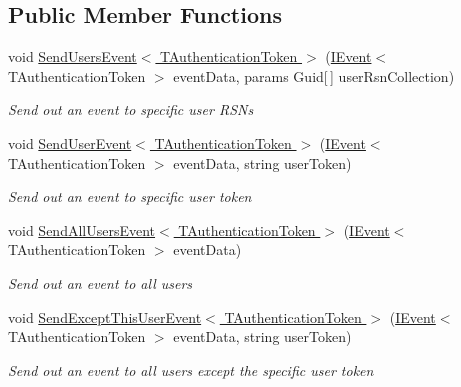 \subsection*{Public Member Functions}
\begin{DoxyCompactItemize}
\item 
void \hyperlink{interfaceCqrs_1_1WebApi_1_1SignalR_1_1Hubs_1_1INotificationHub_a85bd03a0bf9c2083822c4b67691f4297_a85bd03a0bf9c2083822c4b67691f4297}{Send\+Users\+Event$<$ T\+Authentication\+Token $>$} (\hyperlink{interfaceCqrs_1_1Events_1_1IEvent}{I\+Event}$<$ T\+Authentication\+Token $>$ event\+Data, params Guid\mbox{[}$\,$\mbox{]} user\+Rsn\+Collection)
\begin{DoxyCompactList}\small\item\em Send out an event to specific user R\+S\+Ns \end{DoxyCompactList}\item 
void \hyperlink{interfaceCqrs_1_1WebApi_1_1SignalR_1_1Hubs_1_1INotificationHub_a88cb05c6807058bfe2bff48427a45ad2_a88cb05c6807058bfe2bff48427a45ad2}{Send\+User\+Event$<$ T\+Authentication\+Token $>$} (\hyperlink{interfaceCqrs_1_1Events_1_1IEvent}{I\+Event}$<$ T\+Authentication\+Token $>$ event\+Data, string user\+Token)
\begin{DoxyCompactList}\small\item\em Send out an event to specific user token \end{DoxyCompactList}\item 
void \hyperlink{interfaceCqrs_1_1WebApi_1_1SignalR_1_1Hubs_1_1INotificationHub_ada48332e18931747c81997f8350f4066_ada48332e18931747c81997f8350f4066}{Send\+All\+Users\+Event$<$ T\+Authentication\+Token $>$} (\hyperlink{interfaceCqrs_1_1Events_1_1IEvent}{I\+Event}$<$ T\+Authentication\+Token $>$ event\+Data)
\begin{DoxyCompactList}\small\item\em Send out an event to all users \end{DoxyCompactList}\item 
void \hyperlink{interfaceCqrs_1_1WebApi_1_1SignalR_1_1Hubs_1_1INotificationHub_a6a50d35b8df69bb6d5fa9d31902c8ace_a6a50d35b8df69bb6d5fa9d31902c8ace}{Send\+Except\+This\+User\+Event$<$ T\+Authentication\+Token $>$} (\hyperlink{interfaceCqrs_1_1Events_1_1IEvent}{I\+Event}$<$ T\+Authentication\+Token $>$ event\+Data, string user\+Token)
\begin{DoxyCompactList}\small\item\em Send out an event to all users except the specific user token \end{DoxyCompactList}\end{DoxyCompactItemize}


